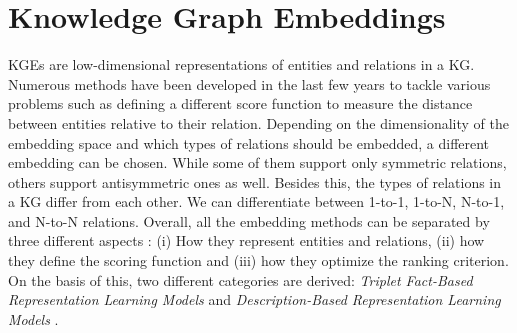 \section{Knowledge Graph Embeddings} 
\label{sec:knowledge_graph_embeddings}


\acp{KGE} are low-dimensional representations of entities and relations in a \ac{KG}. 
Numerous methods have been developed in the last few years to tackle various problems such as defining a different score function to measure the distance between entities relative to their relation.
Depending on the dimensionality of the embedding space and which types of relations should be embedded, a different embedding can be chosen.
While some of them support only symmetric relations, others support antisymmetric ones as well. 
Besides this, the types of relations in a \ac{KG} differ from each other.
We can differentiate between 1-to-1, 1-to-N, N-to-1, and N-to-N relations.
Overall, all the embedding methods can be separated by three different aspects \cite{electronics9050750}:
(i) How they represent entities and relations, (ii) how they define the scoring function and (iii) how they optimize the ranking criterion.
On the basis of this, two different categories are derived:
\textit{Triplet Fact-Based Representation Learning Models}  and \textit{Description-Based Representation Learning Models}  \cite{electronics9050750}.







